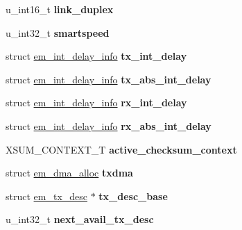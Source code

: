 \begin{DoxyCompactItemize}
u\+\_\+int16\+\_\+t {\bfseries link\+\_\+duplex}
\item 
\mbox{\label{structadapter_aaa109608bcaadff7705885b9ced1fc08}} 
u\+\_\+int32\+\_\+t {\bfseries smartspeed}
\item 
\mbox{\label{structadapter_a722e82cd5eda8b6313da2a3e6d86df9b}} 
struct \mbox{\hyperlink{structem__int__delay__info}{em\+\_\+int\+\_\+delay\+\_\+info}} {\bfseries tx\+\_\+int\+\_\+delay}
\item 
\mbox{\label{structadapter_a1a8025382698c319164dae2fabcd6e0b}} 
struct \mbox{\hyperlink{structem__int__delay__info}{em\+\_\+int\+\_\+delay\+\_\+info}} {\bfseries tx\+\_\+abs\+\_\+int\+\_\+delay}
\item 
\mbox{\label{structadapter_a6c67930b3d22db103241fd8d1bea98e6}} 
struct \mbox{\hyperlink{structem__int__delay__info}{em\+\_\+int\+\_\+delay\+\_\+info}} {\bfseries rx\+\_\+int\+\_\+delay}
\item 
\mbox{\label{structadapter_a91582ae953b369a6f9fd8e0a53449ee1}} 
struct \mbox{\hyperlink{structem__int__delay__info}{em\+\_\+int\+\_\+delay\+\_\+info}} {\bfseries rx\+\_\+abs\+\_\+int\+\_\+delay}
\item 
\mbox{\label{structadapter_a6a95154a4fadfec0ae054b57d6878a3c}} 
X\+S\+U\+M\+\_\+\+C\+O\+N\+T\+E\+X\+T\+\_\+T {\bfseries active\+\_\+checksum\+\_\+context}
\item 
\mbox{\label{structadapter_a9530942a76a01fb57b9fc2f89dbe5f39}} 
struct \mbox{\hyperlink{structem__dma__alloc}{em\+\_\+dma\+\_\+alloc}} {\bfseries txdma}
\item 
\mbox{\label{structadapter_a4143105772e9e3b9dfb5eca779cd949f}} 
struct \mbox{\hyperlink{structem__tx__desc}{em\+\_\+tx\+\_\+desc}} $\ast$ {\bfseries tx\+\_\+desc\+\_\+base}
\item 
\mbox{\label{structadapter_a4701849300f97fd9a69ee5c1a5205a47}} 
u\+\_\+int32\+\_\+t {\bfseries next\+\_\+avail\+\_\+tx\+\_\+desc}
\item 
\mbox{\label{structadapter_ad83ef1b1d610bc1c15e0d5ff890877ef}} 

\end{DoxyCompactItemize}

